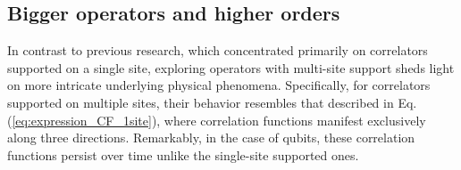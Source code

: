 \documentclass[aps,prx,twocolumn,notitlepage,nofootinbib,nobalancelastpage]{revtex4-2}
\theoremstyle{break}
\newcommand{\1}{\mathbbm{1}}
\theoremstyle{plain}
\theoremstyle{plain}
\theoremstyle{plain}
\begin{document}
\subsection{Bigger operators and higher orders}
\label{subsec:Biggersupports}

In contrast to previous research, which concentrated primarily on correlators supported on a single site, exploring operators with multi-site support sheds light on more intricate underlying physical phenomena. %
Specifically, for correlators supported on multiple sites, their behavior resembles that described in Eq. (\ref{eq:expression_CF_1site}), where correlation functions manifest exclusively along three directions. Remarkably, in the case of qubits, these correlation functions persist over time unlike the single-site supported ones.
\end{document}

